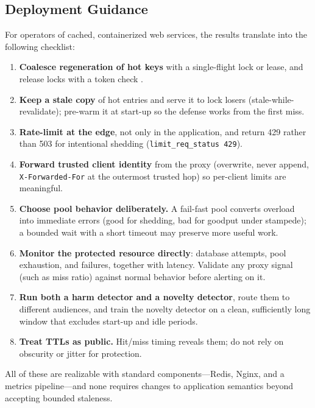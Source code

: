 \subsection{Deployment Guidance}
For operators of cached, containerized web services, the results translate into the
following checklist:
\begin{enumerate}[leftmargin=*]
\item \textbf{Coalesce regeneration of hot keys} with a single-flight lock or lease,
and release locks with a token check \cite{kleppmann2016}.
\item \textbf{Keep a stale copy} of hot entries and serve it to lock losers
(stale-while-revalidate); pre-warm it at start-up so the defense works from the first
miss.
\item \textbf{Rate-limit at the edge}, not only in the application, and return 429
rather than 503 for intentional shedding (\texttt{limit\_req\_status 429}).
\item \textbf{Forward trusted client identity} from the proxy (overwrite, never
append, \texttt{X-Forwarded-For} at the outermost trusted hop) so per-client limits are
meaningful.
\item \textbf{Choose pool behavior deliberately.} A fail-fast pool converts overload
into immediate errors (good for shedding, bad for goodput under stampede); a bounded
wait with a short timeout may preserve more useful work.
\item \textbf{Monitor the protected resource directly}: database attempts, pool
exhaustion, and failures, together with latency. Validate any proxy signal (such as
miss ratio) against normal behavior before alerting on it.
\item \textbf{Run both a harm detector and a novelty detector}, route them to
different audiences, and train the novelty detector on a clean, sufficiently long
window that excludes start-up and idle periods.
\item \textbf{Treat TTLs as public.} Hit/miss timing reveals them; do not rely on
obscurity or jitter for protection.
\end{enumerate}
All of these are realizable with standard components---Redis, Nginx, and a metrics
pipeline---and none requires changes to application semantics beyond accepting bounded
staleness.

